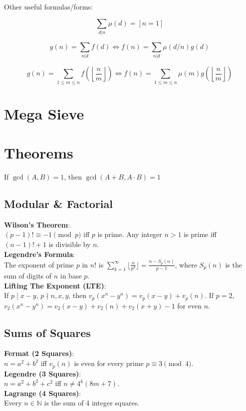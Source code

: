   Other useful formulas/forms:

  \[ \sum_{d | n} \mu(d) = [ n = 1] \]

  \[ g(n) = \sum_{n|d} f(d) \Leftrightarrow f(n) = \sum_{n|d} \mu(d/n)g(d) \]

 \[ g(n) = \sum_{1 \leq m \leq n} f(\left\lfloor\frac{n}{m}\right \rfloor ) \Leftrightarrow f(n) = \sum_{1\leq m\leq n} \mu(m)g(\left\lfloor\frac{n}{m}\right\rfloor) \]

 \section{Mega Sieve}

\section{Theorems}
If $\gcd(A, B) = 1$, then $\gcd(A+B, A \cdot B) = 1$
\subsection{Modular \& Factorial}
	\textbf{Wilson's Theorem}: \\ $(p-1)! \equiv -1 \pmod p$ iff $p$ is prime. Any integer $n > 1$ is prime iff $(n-1)! + 1$ is divisible by $n$. \\
	\textbf{Legendre's Formula}: \\ The exponent of prime $p$ in $n!$ is $\sum_{k=1}^{\infty} \lfloor \frac{n}{p^k} \rfloor = \frac{n - S_p(n)}{p-1}$, where $S_p(n)$ is the sum of digits of $n$ in base $p$. \\
	\textbf{Lifting The Exponent (LTE)}: \\ If $p \mid x-y$, $p \nmid n, x, y$, then $v_p(x^n-y^n) = v_p(x-y) + v_p(n)$. If $p=2$, $v_2(x^n-y^n) = v_2(x-y) + v_2(n) + v_2(x+y) - 1$ for even $n$. \\
\subsection{Sums of Squares}
	\textbf{Fermat (2 Squares)}: \\ $n = a^2+b^2$ iff $v_p(n)$ is even for every prime $p \equiv 3 \pmod 4$. \\
	\textbf{Legendre (3 Squares)}: \\ $n = a^2+b^2+c^2$ iff $n \neq 4^k(8m+7)$. \\
	\textbf{Lagrange (4 Squares)}: \\ Every $n \in \mathbb{N}$ is the sum of 4 integer squares. \\
